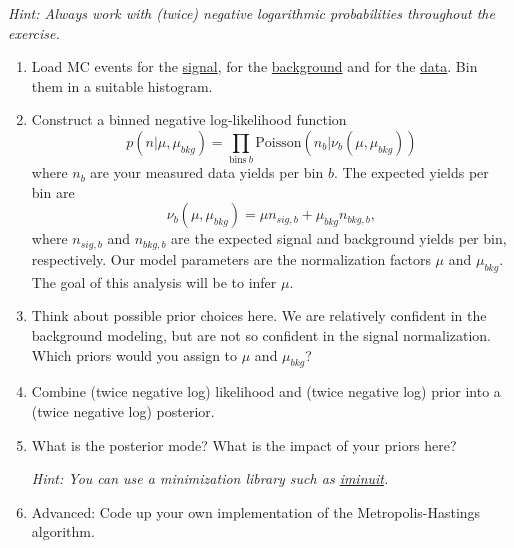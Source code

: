 \documentclass{article}
\begin{document}
\textit{Hint: Always work with (twice) negative logarithmic probabilities throughout the exercise.}
\begin{enumerate}
    \item Load MC events for the \href{https://github.com/lorenzennio/icsc-bayesian-inference/blob/main/mc_signal.txt}{signal}, for the \href{https://github.com/lorenzennio/icsc-bayesian-inference/blob/main/mc_background.txt}{background} and for the \href{https://github.com/lorenzennio/icsc-bayesian-inference/blob/main/LHC_data.txt}{data}. Bin them in a suitable histogram.

    \item Construct a binned negative log-likelihood function
    $$p(n|\mu, \mu_{bkg}) = \prod_{\mathrm{bins}~b} \mathrm{Poisson}(n_b|\nu_b(\mu, \mu_{bkg}))$$
    where $n_b$ are your measured data yields per bin $b$. The expected yields per bin are
    $$\nu_b(\mu, \mu_{bkg}) = \mu n_{sig,b} + \mu_{bkg} n_{bkg, b},$$
    where $n_{sig,b}$ and $n_{bkg,b}$ are the expected signal and background yields per bin, respectively. Our model parameters are the normalization factors $\mu$ and $\mu_{bkg}$. The goal of this analysis will be to infer $\mu$.

    \item Think about possible prior choices here. We are relatively confident in the background modeling, but are not so confident in the signal normalization. Which priors would you assign to $\mu$ and $\mu_{bkg}$?

    \item Combine (twice negative log) likelihood and (twice negative log) prior into a (twice negative log) posterior.

    \item What is the posterior mode? What is the impact of your priors here?
    
    \textit{Hint: You can use a minimization library such as \href{https://scikit-hep.org/iminuit/}{iminuit}.}


    \item {Advanced: Code up your own implementation of the Metropolis-Hastings algorithm.}


\end{enumerate}
\end{document}
